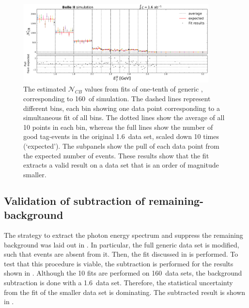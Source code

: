 \begin{figure}[htbp!]
    \includegraphics[width=0.9\textwidth]{figures/mc_validation/extracted_signal_generic_mc.pdf}
    \caption{\label{fig:extracted_validation_mc}The estimated $\mathcal{N}_{CB}$ values from fits of one-tenth of generic \MC, corresponding to 160~\invfb of simulation.
    The dashed lines represent different \EB bins, each bin showing one data point corresponding to a simultaneous fit of all \EB bins.
    The dotted lines show the average of all 10 points in each bin, whereas the full lines show the number of good tag-\B events in the original 1.6~\invab data set, scaled down 10 times (`expected').
    The subpanels show the pull of each data point from the expected number of events.
    These results show that the fit extracts a valid result on a data set that is an order of magnitude smaller.
    }
\end{figure}

\subsection{Validation of subtraction of remaining-\texorpdfstring{\BB}{BB} background}\label{sec:background_subtraction_validation_mc}

The strategy to extract the \BtoXsgamma photon energy spectrum and suppress the remaining \BB background was laid out in .
In particular, the full generic \MC data set is modified, such that \BtoXsgamma events are absent from it.
Then, the \Mbc fit discussed in  is performed.
To test that this procedure is viable, the subtraction is performed for the results shown in .
Although the 10 fits are performed on 160~\invfb data sets, the background subtraction is done with a 1.6~\invab data set.
Therefore, the statistical uncertainty from the fit of the smaller data set is dominating.
The subtracted result is shown in .

